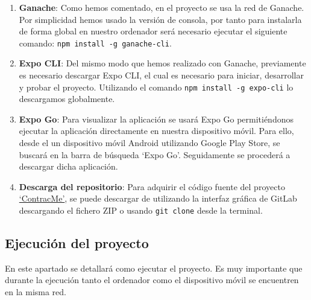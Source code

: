 \begin{enumerate}
\item \textbf{Ganache}: Como hemos comentado, en el proyecto se usa la red de Ganache. Por simplicidad hemos usado la versión de consola, por tanto para instalarla de forma global en nuestro ordenador será necesario ejecutar el siguiente comando: \texttt{npm install -g ganache-cli}.

\item \textbf{Expo CLI}: Del mismo modo que hemos realizado con Ganache, previamente es necesario descargar Expo CLI, el cual es necesario para iniciar, desarrollar y probar el proyecto.
Utilizando el comando \texttt{npm install -g expo-cli} lo descargamos globalmente.

\item \textbf{Expo Go}: Para visualizar la aplicación se usará Expo Go permitiéndonos ejecutar la aplicación directamente en nuestra dispositivo móvil.
Para ello, desde el un dispositivo móvil Android utilizando Google Play Store, se buscará en la barra de búsqueda `Expo Go'.  Seguidamente se procederá a descargar dicha aplicación.

\item \textbf{Descarga del repositorio}: Para adquirir el código fuente del proyecto \href{https://gitlab.com/HP-SCDS/Observatorio/2023-2024/contractme/ubu-contractme.git}{`ContracMe'}, se puede descargar de utilizando la interfaz gráfica de GitLab descargando el fichero ZIP o usando \texttt{git clone} desde la terminal.

\end{enumerate}


\subsection{Ejecución del proyecto}

En este apartado se detallará como ejecutar el proyecto. Es muy importante que durante la ejecución tanto el ordenador como el dispositivo móvil se encuentren en la misma red.

